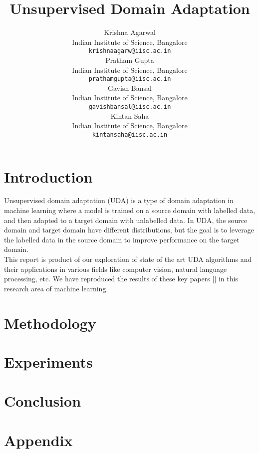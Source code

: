 \documentclass{article}
\title{Unsupervised Domain Adaptation}
\author{ Krishna Agarwal\\%
  Indian Institute of Science, Bangalore\\
  \texttt{krishnaagarw@iisc.ac.in} \\
   \And
  {Pratham Gupta} \\
  Indian Institute of Science, Bangalore\\
  \texttt{prathamgupta@iisc.ac.in} \\
   \And
   {Gavish Bansal} \\
   Indian Institute of Science, Bangalore\\
   \texttt{gavishbansal@iisc.ac.in} \\
   \And
   {Kintan Saha} \\
   Indian Institute of Science, Bangalore\\
   \texttt{kintansaha@iisc.ac.in} \\
}
\begin{document}
\maketitle


\begin{abstract}
  
\end{abstract}


\section{Introduction}
Unsupervised domain adaptation (UDA) is a type of domain adaptation in machine learning where a model is trained on a source domain with labelled data, and then adapted to a target domain with unlabelled data.
In UDA, the source domain and target domain have different distributions, but
the goal is to leverage the labelled data in the source domain to improve performance on the target
domain. \\
This report is product of our exploration of state of the art UDA algorithms and their applications in various fields like computer vision, natural language processing, etc. 
We have reproduced the results of these key papers [] in this research area of machine learning.

\section{Methodology}
\section{Experiments}
\section{Conclusion}

\section*{Appendix}



\end{document}
